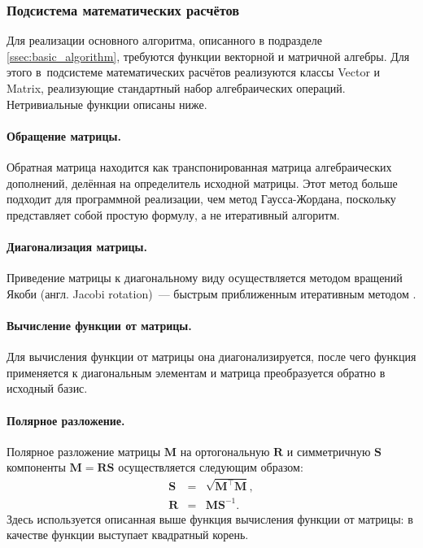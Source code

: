 \documentclass[a4paper, 14pt, titlepage]{extarticle}
\newcommand{\eng}[1]{{\English #1}}
\newcommand{\matx}[1]{\mathbf{#1}} %
\newcommand{\transposed}{\top} %
\begin{document}
      \subsubsection{Подсистема математических расчётов}

        Для реализации основного алгоритма, описанного в подразделе \ref{ssec:basic_algorithm}, требуются
        функции векторной и матричной алгебры. Для этого в~подсистеме математических расчётов реализуются
        классы Vector и Matrix, реализующие стандартный набор алгебраических операций. Нетривиальные
        функции описаны ниже.

        \paragraph{Обращение матрицы.}
        Обратная матрица находится как транспонированная матрица алгебраических дополнений, делённая
        на определитель исходной матрицы. Этот метод больше подходит для программной реализации, чем
        метод Гаусса-Жордана, поскольку представляет собой простую формулу, а не итеративный
        алгоритм.

        \paragraph{Диагонализация матрицы.}
        Приведение матрицы к диагональному виду осуществляется методом вращений Якоби (англ.
        \eng{Jacobi rotation})~--- быстрым приближенным итеративным методом \cite{fortran-jacobi}.

        \paragraph{Вычисление функции от матрицы.}
        Для вычисления функции от матрицы она диагонализируется, после чего функция применяется к
        диагональным элементам и матрица преобразуется обратно в исходный базис.

        \paragraph{Полярное разложение.}
        Полярное разложение матрицы $\matx M$ на ортогональную $\matx R$ и симметричную $\matx S$ компоненты
        $\matx M = \matx R \matx S$ осуществляется следующим образом:
        \begin{eqnarray*}
          \matx S & = & \sqrt{\matx{M}^\transposed \matx{M}},\\
          \matx R & = & \matx M \matx{S}^{-1}.
        \end{eqnarray*}
        Здесь используется описанная выше функция вычисления функции от матрицы: в качестве функции
        выступает квадратный корень.
\end{document}
